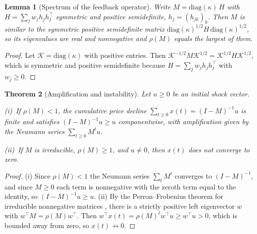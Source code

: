 \documentclass[11pt]{article}
\newtheorem{theorem}{Theorem}[section]
\newtheorem{lemma}[theorem]{Lemma}
\theoremstyle{definition}
\theoremstyle{remark}
\begin{document}
\begin{lemma}[Spectrum of the feedback operator]\label{lem:spectrum}
Write $M=\mathrm{diag}(\kappa)\,H$ with $H=\sum_jw_jh_jh_j^{\top}$ symmetric and positive semidefinite, $h_j=(h_{jk})_k$. Then $M$ is similar to the symmetric positive semidefinite matrix $\mathrm{diag}(\kappa)^{1/2}H\,\mathrm{diag}(\kappa)^{1/2}$, so its eigenvalues are real and nonnegative and $\rho(M)$ equals the largest of them.
\end{lemma}

\begin{proof}
Let $\mathcal K=\mathrm{diag}(\kappa)$ with positive entries. Then $\mathcal K^{-1/2}M\mathcal K^{1/2}=\mathcal K^{1/2}H\mathcal K^{1/2}$, which is symmetric and positive semidefinite because $H=\sum_jw_jh_jh_j^\top$ with $w_j\ge 0$.
\end{proof}

\begin{theorem}[Amplification and instability]\label{thm:amp}
Let $u\ge 0$ be an initial shock vector.
\par\smallskip\noindent(i)~If $\rho(M)<1$, the cumulative price decline $\sum_{t\ge 0}x(t)=(I-M)^{-1}u$ is finite and satisfies $(I-M)^{-1}u\ge u$ componentwise, with amplification given by the Neumann series $\sum_{t\ge 0}M^tu$.
\par\smallskip\noindent(ii)~If $M$ is irreducible, $\rho(M)\ge 1$, and $u\ne 0$, then $x(t)$ does not converge to zero.
\end{theorem}

\begin{proof}
(i) Since $\rho(M)<1$ the Neumann series $\sum_tM^t$ converges to $(I-M)^{-1}$, and since $M\ge 0$ each term is nonnegative with the zeroth term equal to the identity, so $(I-M)^{-1}u\ge u$. (ii) By the Perron--Frobenius theorem for irreducible nonnegative matrices \cite{horn2013}, there is a strictly positive left eigenvector $w$ with $w^\top M=\rho(M)w^\top$. Then $w^\top x(t)=\rho(M)^tw^\top u\ge w^\top u>0$, which is bounded away from zero, so $x(t)\not\to 0$.
\end{proof}
\end{document}
